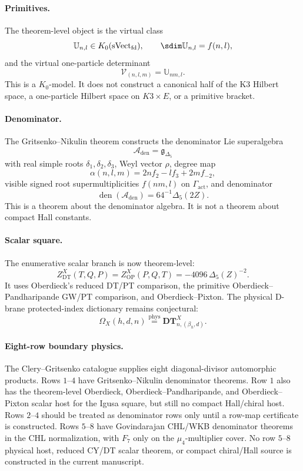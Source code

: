 \paragraph{Primitives.}
The theorem-level object is the virtual class
\[
\mathbb U_{n,l}\in K_0(\mathrm{sVect}_{\mathrm{fd}}),\qquad
\sdim\mathbb U_{n,l}=f(n,l),
\]
and the virtual one-particle determinant
\[
\mathcal V_{(n,l,m)}=\mathbb U_{nm,l}.
\]
This is a \(K_0\)-model.  It does not construct a canonical half of the
K3 Hilbert space, a one-particle Hilbert space on \(K3\times E\), or a
primitive bracket.

\paragraph{Denominator.}
The Gritsenko--Nikulin theorem constructs the denominator Lie
superalgebra
\[
\mathcal A_{\mathrm{den}}=\mathfrak g_{\Delta_5}
\]
with real simple roots \(\delta_1,\delta_2,\delta_3\), Weyl vector
\(\rho\), degree map
\[
\alpha(n,l,m)=2nf_2-lf_3+2mf_{-2},
\]
visible signed root supermultiplicities \(f(nm,l)\) on
\(\Gamma_{\mathrm{act}}\), and denominator
\[
\operatorname{den}(\mathcal A_{\mathrm{den}})
=64^{-1}\Delta_5(2Z).
\]
This is a theorem about the denominator algebra.  It is not a theorem
about compact Hall constants.

\paragraph{Scalar square.}
The enumerative scalar branch is now theorem-level:
\[
Z^X_{\mathrm{DT}}(T,Q,P)
=Z^X_{\mathrm{OP}}(P,Q,T)
=-4096\,\Delta_5(Z)^{-2}.
\]
It uses Oberdieck's reduced DT/PT comparison, the primitive
Oberdieck--Pandharipande GW/PT comparison, and Oberdieck--Pixton.  The
physical D-brane protected-index dictionary remains conjectural:
\[
\Omega_X(h,d,n)\stackrel{\mathrm{phys}}{=}
\mathbf{DT}^X_{n,(\beta_h,d)}.
\]

\paragraph{Eight-row boundary physics.}
The Clery--Gritsenko catalogue supplies eight diagonal-divisor
automorphic products.  Rows \(1\)--\(4\) have Gritsenko--Nikulin
denominator theorems.  Row \(1\) also has the theorem-level
Oberdieck, Oberdieck--Pandharipande, and Oberdieck--Pixton scalar host
for the Igusa square, but still no compact Hall/chiral host.  Rows
\(2\)--\(4\) should be treated as denominator rows only until a row-map
certificate is constructed.  Rows \(5\)--\(8\) have Govindarajan
CHL/WKB denominator theorems in the CHL normalization, with \(F_7\)
only on the \(\mu_4\)-multiplier cover.  No row \(5\)--\(8\) physical
host, reduced CY/DT scalar theorem, or compact chiral/Hall source is
constructed in the current manuscript.


